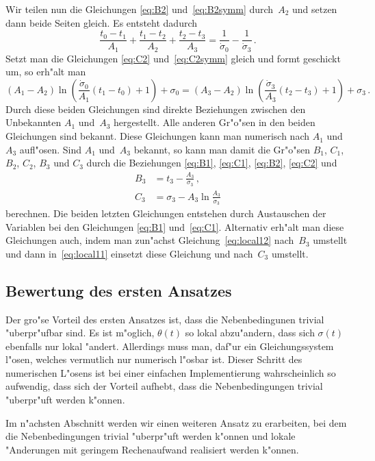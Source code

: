 \documentclass[a4paper]{scrartcl}
\begin{document}
Wir teilen nun die Gleichungen \eqref{eq:B2} und~\eqref{eq:B2symm} durch~$A_2$ und setzen dann beide Seiten gleich. 
Es entsteht dadurch
$$ \frac{t_0-t_1}{A_1}+\frac{t_1-t_2}{A_2}+\frac{t_2-t_3}{A_3} 
  = \frac{1}{\dot\sigma_0}-\frac{1}{\dot\sigma_3}\,. $$
Setzt man die Gleichungen \eqref{eq:C2} und~\eqref{eq:C2symm} gleich und formt geschickt um, so erh"alt man
$$ (A_1-A_2)\ln\left(\frac{\dot\sigma_0}{A_1}(t_1-t_0)+1\right)+\sigma_0
  = (A_3-A_2)\ln\left(\frac{\dot\sigma_3}{A_3}(t_2-t_3)+1\right)+\sigma_3\,. $$
Durch diese beiden Gleichungen sind direkte Beziehungen zwischen den Unbekannten $A_1$ und~$A_3$ hergestellt. 
Alle anderen Gr"o"sen in den beiden Gleichungen sind bekannt. 
Diese Gleichungen kann man numerisch nach $A_1$ und~$A_3$ aufl"osen. 
Sind $A_1$ und~$A_3$ bekannt, so kann man damit die Gr"o"sen $B_1$, $C_1$, $B_2$, $C_2$, $B_3$ und $C_3$ durch die Beziehungen \eqref{eq:B1}, \eqref{eq:C1}, \eqref{eq:B2}, \eqref{eq:C2} und 
\begin{align*}
  B_3 &= t_3-\frac{A_3}{\dot\sigma_3}\,, \\
  C_3 &= \sigma_3-A_3\ln\frac{A_3}{\dot\sigma_3}
\end{align*}
berechnen. Die beiden letzten Gleichungen entstehen durch Austauschen der Variablen bei den Gleichungen \eqref{eq:B1} und~\eqref{eq:C1}. 
Alternativ erh"alt man diese Gleichungen auch, indem man zun"achst Gleichung~\eqref{eq:local12} nach~$B_3$ umstellt und dann in~\eqref{eq:local11} einsetzt diese Gleichung und nach~$C_3$ umstellt. 


\subsection{Bewertung des ersten Ansatzes}

Der gro"se Vorteil des ersten Ansatzes ist, dass die Nebenbedingunen trivial "uberpr"ufbar sind. 
Es ist m"oglich, $\theta(t)$ so lokal abzu"andern, dass sich $\sigma(t)$ ebenfalls nur lokal "andert. 
Allerdings muss man, daf"ur ein Gleichungssystem l"osen, welches vermutlich nur numerisch l"osbar ist. 
Dieser Schritt des numerischen L"osens ist bei einer einfachen Implementierung wahrscheinlich so aufwendig, dass sich der Vorteil aufhebt, dass die Nebenbedingungen trivial "uberpr"uft werden k"onnen. 

Im n"achsten Abschnitt werden wir einen weiteren Ansatz zu erarbeiten, bei dem die Nebenbedingungen trivial "uberpr"uft werden k"onnen und lokale "Anderungen mit geringem Rechenaufwand realisiert werden k"onnen.
\end{document}
